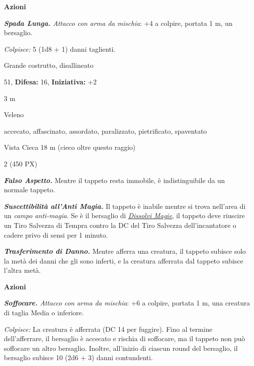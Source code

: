 \begin{multicols}{2}
{\textbf{Azioni}

\emph{\textbf{Spada Lunga.} Attacco con arma da mischia}: +4 a colpire, portata 1 m, un bersaglio.

\emph{Colpisce:} 5 (1d8 + 1) danni taglienti.

\noindent
\begin{description}[noitemsep, topsep=0pt, parsep=0pt, partopsep=0pt, leftmargin=0cm, labelwidth=2.2cm]
	\item[\textbf{Taglia/Tipo:}] Grande costrutto, disallineato
	\item[\textbf{Caratt.:}] 
	\item[\textbf{Punti Ferita:}] 51,  \textbf{Difesa:} 16,  \textbf{Iniziativa:} +2
	\item[\textbf{Movimento:}] 3 m
	\item[\textbf{Tiri Salvez.:}] 
	\item[\textbf{Imm. Danni:}] Veleno
	\item[\textbf{Immunità:}] accecato, affascinato, assordato, paralizzato, pietrificato, spaventato
	\item[\textbf{Sensi:}] Vista Cieca 18 m (cieco oltre questo raggio)
	\item[\textbf{Sfida:}] 2 (450 PX)\smallskip
\end{description}

\emph{\textbf{Falso Aspetto.}} Mentre il tappeto resta immobile, è indistinguibile da un normale tappeto.

\emph{\textbf{Suscettibilità all'Anti Magia.}} Il tappeto è inabile mentre si trova nell'area di un \emph{campo anti-magia}. Se è il bersaglio di \emph{\hyperlink{Dissolvi Magie}{Dissolvi Magie}}, il tappeto deve riuscire un Tiro Salvezza di Tempra contro la DC del Tiro Salvezza dell'incantatore o cadere privo di sensi per 1 minuto.

\emph{\textbf{Trasferimento di Danno.}} Mentre afferra una creatura, il tappeto subisce solo la metà dei danni che gli sono inferti, e la creatura afferrata dal tappeto subisce l'altra metà.

\textbf{Azioni}

\emph{\textbf{Soffocare.} Attacco con arma da mischia}: +6 a colpire, portata 1 m, una creatura di taglia Media o inferiore.

\emph{Colpisce:} La creatura è afferrata (DC 14 per fuggire). Fino al termine dell'afferrare, il bersaglio è accecato e rischia di soffocare, ma il tappeto non può soffocare un altro bersaglio. Inoltre, all'inizio di ciascun round del bersaglio, il bersaglio subisce 10 (2d6 + 3) danni contundenti.

}
\end{multicols}
